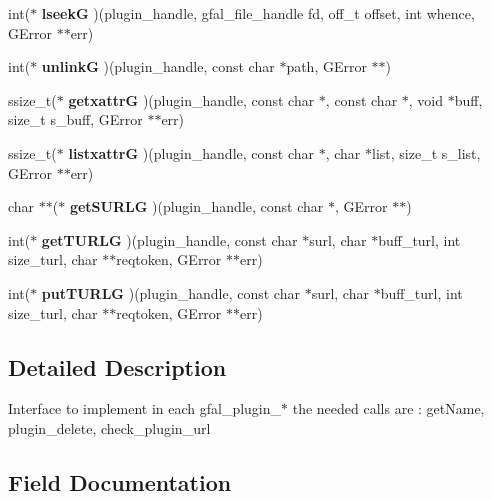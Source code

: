 \begin{CompactItemize}
\item 
int($\ast$ \textbf{lseek\-G} )(plugin\_\-handle, gfal\_\-file\_\-handle fd, off\_\-t offset, int whence, GError $\ast$$\ast$err)\label{struct__gfal__plugin__interface_424d4d77e29e5e4cfe92eae0d6a8bdc2}

\item 
int($\ast$ \textbf{unlink\-G} )(plugin\_\-handle, const char $\ast$path, GError $\ast$$\ast$)\label{struct__gfal__plugin__interface_75692c1e9487ff9ed7fce15dc2ddac62}

\item 
ssize\_\-t($\ast$ \textbf{getxattr\-G} )(plugin\_\-handle, const char $\ast$, const char $\ast$, void $\ast$buff, size\_\-t s\_\-buff, GError $\ast$$\ast$err)\label{struct__gfal__plugin__interface_9c6b4405f17d92e42aa40ff307188701}

\item 
ssize\_\-t($\ast$ \textbf{listxattr\-G} )(plugin\_\-handle, const char $\ast$, char $\ast$list, size\_\-t s\_\-list, GError $\ast$$\ast$err)\label{struct__gfal__plugin__interface_c3bae2e54ce8998722f03b588d423b18}

\item 
char $\ast$$\ast$($\ast$ \textbf{get\-SURLG} )(plugin\_\-handle, const char $\ast$, GError $\ast$$\ast$)\label{struct__gfal__plugin__interface_6282d5a187e9f13cb34cb84684814ebe}

\item 
int($\ast$ \textbf{get\-TURLG} )(plugin\_\-handle, const char $\ast$surl, char $\ast$buff\_\-turl, int size\_\-turl, char $\ast$$\ast$reqtoken, GError $\ast$$\ast$err)\label{struct__gfal__plugin__interface_b80848456d5f1789ceeb38a8446e1689}

\item 
int($\ast$ \textbf{put\-TURLG} )(plugin\_\-handle, const char $\ast$surl, char $\ast$buff\_\-turl, int size\_\-turl, char $\ast$$\ast$reqtoken, GError $\ast$$\ast$err)\label{struct__gfal__plugin__interface_925c6bd0897e927b22f9bd6275991b15}

\end{CompactItemize}


\subsection{Detailed Description}
Interface to implement in each gfal\_\-plugin\_\-$\ast$ the needed calls are : get\-Name, plugin\_\-delete, check\_\-plugin\_\-url 



\subsection{Field Documentation}
